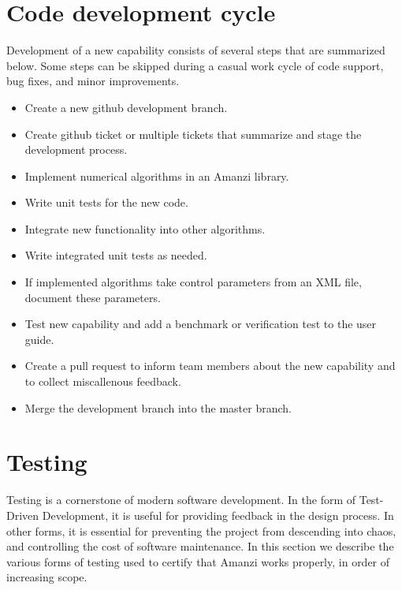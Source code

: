 
\section{Code development cycle}
Development of a new capability consists of several steps that are summarized below.
Some steps can be skipped during a casual work cycle of code support, bug fixes, and minor improvements. 

\begin{itemize}
\item Create a new github development branch.
\item Create github ticket or multiple tickets that summarize and stage the development process.
\item Implement numerical algorithms in an Amanzi library.
\item Write unit tests for the new code.
\item Integrate new functionality into other algorithms.
\item Write integrated unit tests as needed.
\item If implemented algorithms take control parameters from an XML file, 
      document these parameters.
\item Test new capability and add a benchmark or verification test to the
      user guide.
\item Create a pull request to inform team members about the new capability and 
      to collect miscallenous feedback.
\item Merge the development branch into the master branch.
\end{itemize}
\clearpage



\section{Testing}
Testing is a cornerstone of modern software development. In the form of Test-Driven
Development, it is useful for providing feedback in the design process. In other 
forms, it is essential for preventing the project from descending into chaos, and 
controlling the cost of software maintenance. In this section we describe the 
various forms of testing used to certify that Amanzi works properly, in order of 
increasing scope.

